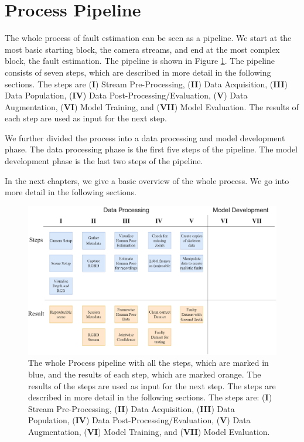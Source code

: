 \section{Process Pipeline}

The whole process of fault estimation can be seen as a pipeline. We start at the most basic starting block, the camera streams, and end at the most complex block, the fault estimation. The pipeline is shown in Figure \ref{fig:process_pipeline}. The pipeline consists of seven steps, which are described in more detail in the following sections. The steps are (\textbf{I}) Stream Pre-Processing, (\textbf{II}) Data Acquisition, (\textbf{III}) Data Population, (\textbf{IV}) Data Post-Processing/Evaluation, (\textbf{V}) Data Augmentation, (\textbf{VI}) Model Training, and (\textbf{VII}) Model Evaluation. The results of each step are used as input for the next step. 

We further divided the process into a data processing and model development phase. The data processing phase is the first five steps of the pipeline. The model development phase is the last two steps of the pipeline.

In the next chapters, we give a basic overview of the whole process. We go into more detail in the following sections.

\begin{figure}[ht]
    \centering
    \includegraphics[width=\textwidth]{figures/ProcessingPipeline/ProcessingPipeline.png}
    \caption[Process Pipeline with all steps]{The whole Process pipeline with all the steps, which are marked in blue, and the results of each step, which are marked orange. The results of the steps are used as input for the next step. The steps are described in more detail in the following sections. The steps are: (\textbf{I}) Stream Pre-Processing, (\textbf{II}) Data Acquisition, (\textbf{III}) Data Population, (\textbf{IV}) Data Post-Processing/Evaluation, (\textbf{V}) Data Augmentation, (\textbf{VI}) Model Training, and (\textbf{VII}) Model Evaluation.}
    \label{fig:process_pipeline}
\end{figure}

